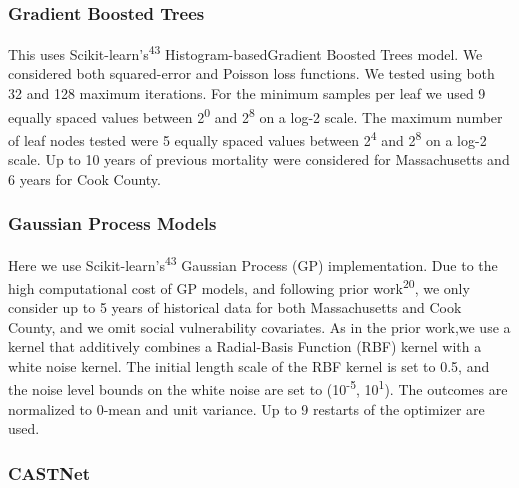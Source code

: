 \subsubsection{Gradient Boosted Trees}\label{gradient-boosted-trees}

This uses Scikit-learn's\textsuperscript{43} Histogram-basedGradient Boosted Trees model. We considered both squared-error and Poisson loss functions. We tested using both 32 and 128 maximum iterations. For the minimum samples per leaf we used 9 equally spaced values between 2\textsuperscript{0} and 2\textsuperscript{8} on a log-2 scale. The maximum number of leaf nodes tested were 5 equally spaced values between 2\textsuperscript{4} and 2\textsuperscript{8} on a log-2 scale. Up to 10 years of previous mortality were considered for Massachusetts and 6 years for Cook County.

\subsubsection{Gaussian Process Models}\label{gaussian-process-models}

Here we use Scikit-learn's\textsuperscript{43} Gaussian Process (GP) implementation. Due to the high computational cost of GP models, and following prior work\textsuperscript{20}, we only consider up to 5 years of historical data for both Massachusetts and Cook County, and we omit social vulnerability covariates. As in the prior work,we use a kernel that additively combines a Radial-Basis Function (RBF) kernel with a white noise kernel. The initial length scale of the RBF kernel is set to 0.5, and the noise level bounds on the white noise are set to (10\textsuperscript{-5}, 10\textsuperscript{1}). The outcomes are normalized to 0-mean and unit variance. Up to 9 restarts of the optimizer are used.

\subsubsection{CASTNet}\label{castnet}

